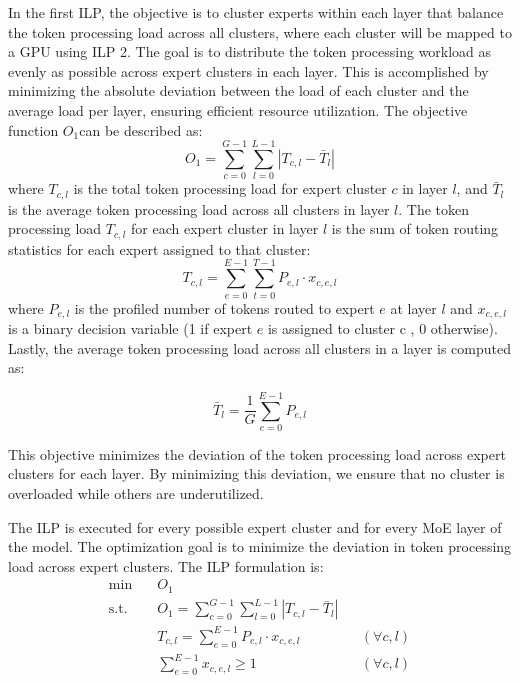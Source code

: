 %
In the first ILP, the objective is to cluster experts within each layer that balance the token processing load across all clusters, where each cluster will be mapped to a GPU using ILP 2. 
%
The goal is to distribute the token processing workload as evenly as possible across expert clusters in each layer. 
%
This is accomplished by minimizing the absolute deviation between the load of each cluster and the average load per layer, ensuring efficient resource utilization. The objective function \(O_1\)can be described as:
%
\vspace{-0.5ex}
\begin{equation}
    O_1 = \sum_{c=0}^{G-1} \sum_{l=0}^{L-1} \left| T_{c,l} - \bar{T}_l \right|
\end{equation}
\vspace{-0.5ex}
%
where $T_{c,l}$ is the total token processing load for expert cluster $c$ in layer $l$, and $\bar{T}_l$ is the average token processing load across all clusters in layer $l$.
%
The token processing load $T_{c,l}$ for each expert cluster in layer $l$ is the sum of token routing statistics for each expert assigned to that cluster:
\vspace{-0.5ex}
%
\begin{equation}
    T_{c,l} = \sum_{e=0}^{E-1} \sum_{t=0}^{T-1} P_{e,l} \cdot x_{c,e,l}
\end{equation}
%
\vspace{-0.5ex}
where $P_{e,l}$ is the profiled number of tokens routed to expert $e$ at layer $l$ and $x_{c,e,l}$ is a binary decision variable (1 if expert $e$ is assigned to cluster c , 0 otherwise).
%
Lastly, the average token processing load across all clusters in a layer is computed as:

\vspace{-0.5ex}
\begin{equation}
    \bar{T}_l = \frac{1}{G} \sum_{e=0}^{E-1} P_{e,l}
\end{equation}
%
\vspace{-0.5ex}

This objective minimizes the deviation of the token processing load across expert clusters for each layer. 
%
By minimizing this deviation, we ensure that no cluster is overloaded while others are underutilized.

The ILP is executed for every possible expert cluster and for every MoE layer of the model.
The optimization goal is to minimize the deviation in token processing load across expert clusters. The ILP formulation is:
%
\begin{align}
\text{min} \quad & O_1 \\
\text{s.t.} \quad & O_1 = \sum_{c=0}^{G-1} \sum_{l=0}^{L-1} \left| T_{c,l} - \bar{T}_l \right| \\
\quad & T_{c,l} = \sum_{e=0}^{E-1} P_{e,l} \cdot x_{c,e,l} && (\forall c, l) \\
& \sum_{e=0}^{E-1} x_{c,e,l} \geq 1 && (\forall c, l)
\end{align}

